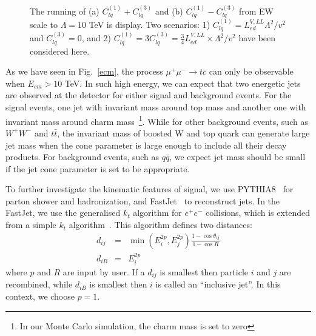 \documentclass[a4paper,11pt]{article}
\begin{document}
\begin{figure}
  \centering
  \caption{The running of (a) $C^{(1)}_{lq}+C^{(3)}_{lq}$ and (b) $C^{(1)}_{lq}-C^{(3)}_{lq}$ from EW scale to $\Lambda=10$ TeV is display.  Two scenarios: 1) $C^{(1)}_{lq}=L^{V,LL}_{ed}\Lambda^2/v^2$ and $C^{(3)}_{lq}=0$, and 2) $C^{(1)}_{lq}=3C^{(3)}_{lq}=\frac{3}{4}L^{V,LL}_{ed}\times \Lambda^2/v^2$ have been considered here.\label{rge:EWtoUV}}
\end{figure}

As we have seen in Fig.~\ref{ecm}, the process $\mu^+\mu^-\to t\bar{c}$ can only be observable when $E_{cm}>10$ TeV.  
In such high energy, we can expect that two energetic jets are observed at the detector for either signal and background events. 
For the signal events, one jet with invariant mass around top mass and another one with invariant mass around charm mass~\footnote{In our Monte Carlo simulation, the charm mass is set to zero}. 
While for other background events, such as $W^+ W^-$ and $t \bar{t}$, the invariant mass of boosted W and top quark can generate large jet mass when the cone parameter is large enough to include all their decay products.
For background events, such as $q\bar{q}$, we expect jet mass should be small if the jet cone parameter is set to be appropriate.

To further investigate the kinematic features of signal, 
we use PYTHIA8~\cite{Bierlich:2022pfr} for parton shower and hadronization, 
and FastJet~\cite{Cacciari:2011ma} to reconstruct jets.  
In the FastJet, we use the generalised $k_t$ algorithm for $e^+e^-$ collisions, 
which is extended from a simple $k_t$ algorithm~\cite{Catani:1991hj}.
This algorithm defines two distances:
\begin{eqnarray}
  d_{ij} &=& \min(E^{2p}_i,E^{2p}_j)\frac{1-\cos\theta_{ij}}{1-\cos{R}} \\
  d_{iB} &=& E^{2p}_i 
\end{eqnarray}
where $p$ and $R$ are input by user. 
If a $d_{ij}$ is smallest then particle $i$ and $j$ are recombined, while $d_{iB}$ is smallest then $i$ is called an ``inclusive jet''.
In this context, we choose $p=1$.
\end{document}

